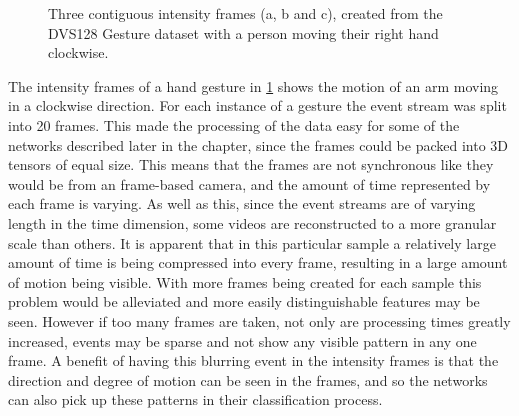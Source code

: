 \begin{figure}[htb]%
    \centering
    \qquad
    \qquad
    \caption{Three contiguous intensity frames ({a}, {b} and {c}), created from the DVS128 Gesture dataset with a person moving their right hand clockwise.}%
    \label{fig:dvs128_integrated_frames}%
\end{figure}

The intensity frames of a hand gesture in \cref{fig:dvs128_integrated_frames} shows the motion of an arm moving in a clockwise direction. For each instance of a gesture the event stream was split into 20 frames. This made the processing of the data easy for some of the networks described later in the chapter, since the frames could be packed into 3D tensors of equal size. This means that the frames are not synchronous like they would be from an frame-based camera, and the amount of time represented by each frame is varying. As well as this, since the event streams are of varying length in the time dimension, some videos are reconstructed to a more granular scale than others. It is apparent that in this particular sample a relatively large amount of time is being compressed into every frame, resulting in a large amount of motion being visible. With more frames being created for each sample this problem would be alleviated and more easily distinguishable features may be seen. However if too many frames are taken, not only are processing times greatly increased, events may be sparse and not show any visible pattern in any one frame. A benefit of having this blurring event in the intensity frames is that the direction and degree of motion can be seen in the frames, and so the networks can also pick up these patterns in their classification process.

